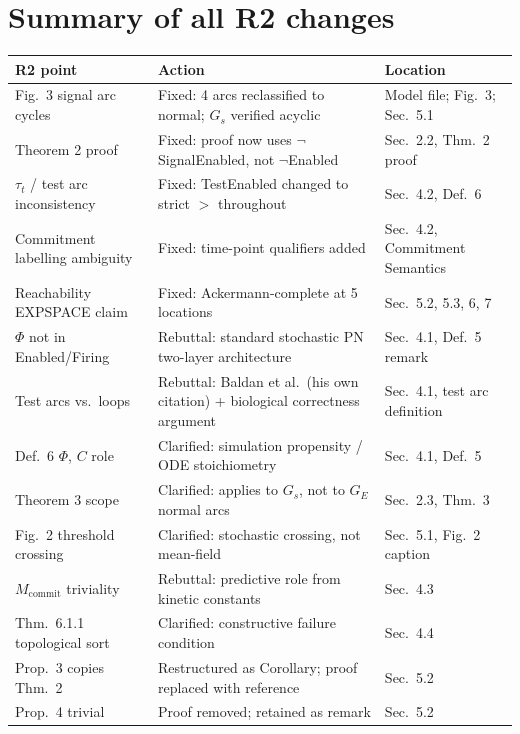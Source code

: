 \documentclass[11pt,letterpaper]{article}
\begin{document}
\bigskip

\section*{Summary of all R2 changes}

\begin{center}
\renewcommand{\arraystretch}{1.3}
\begin{tabular}{p{4.5cm}p{4cm}p{4.5cm}}
\toprule
\textbf{R2 point} & \textbf{Action} & \textbf{Location} \\
\midrule
Fig.\ 3 signal arc cycles & Fixed: 4 arcs reclassified to normal; $G_s$ verified acyclic & Model file; Fig.\ 3; Sec.~5.1 \\
Theorem 2 proof & Fixed: proof now uses $\neg$SignalEnabled, not $\neg$Enabled & Sec.~2.2, Thm.~2 proof \\
$\tau_t$ / test arc inconsistency & Fixed: TestEnabled changed to strict $>$ throughout & Sec.~4.2, Def.~6 \\
Commitment labelling ambiguity & Fixed: time-point qualifiers added & Sec.~4.2, Commitment Semantics \\
Reachability EXPSPACE claim & Fixed: Ackermann-complete at 5 locations & Sec.~5.2, 5.3, 6, 7 \\
$\Phi$ not in Enabled/Firing & Rebuttal: standard stochastic PN two-layer architecture & Sec.~4.1, Def.~5 remark \\
Test arcs vs.\ loops & Rebuttal: Baldan et al.\ (his own citation) + biological correctness argument & Sec.~4.1, test arc definition \\
Def.\ 6 $\Phi$, $C$ role & Clarified: simulation propensity / ODE stoichiometry & Sec.~4.1, Def.~5 \\
Theorem 3 scope & Clarified: applies to $G_s$, not to $G_E$ normal arcs & Sec.~2.3, Thm.~3 \\
Fig.\ 2 threshold crossing & Clarified: stochastic crossing, not mean-field & Sec.~5.1, Fig.~2 caption \\
$M_{\mathrm{commit}}$ triviality & Rebuttal: predictive role from kinetic constants & Sec.~4.3 \\
Thm.\ 6.1.1 topological sort & Clarified: constructive failure condition & Sec.~4.4 \\
Prop.\ 3 copies Thm.\ 2 & Restructured as Corollary; proof replaced with reference & Sec.~5.2 \\
Prop.\ 4 trivial & Proof removed; retained as remark & Sec.~5.2 \\
\bottomrule
\end{tabular}
\end{center}
\end{document}
